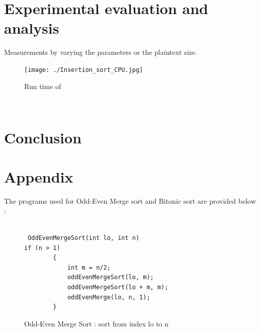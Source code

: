 \documentclass{acm_proc_article-sp}
\begin{document}
\lstset{                                    %
  language=C,
  frame=lines,
  captionpos=b
 }


\renewcommand{\lstlistingname}{Code}

\section{Experimental evaluation and analysis}
\label{Sec:Eval}
Measurements by varying the parameters or the plaintext size.

\begin{figure}[!h] %
\centering
\texttt{[image: ./Insertion\_sort\_CPU.jpg]} 
\caption{Run time of } 
\label{image_f2} %
\end{figure}
\





\section{Conclusion}




  

\newpage
\section{Appendix}

 The programs used for Odd-Even Merge sort and Bitonic sort are provided below : 


\begin{figure}[h]
\begin{lstlisting}[label = oesort ]

 OddEvenMergeSort(int lo, int n)
if (n > 1)
        {
            int m = n/2;
            oddEvenMergeSort(lo, m);
            oddEvenMergeSort(lo + m, m);
            oddEvenMerge(lo, n, 1);
        }

\end{lstlisting}
\caption{Odd-Even Merge Sort : sort from index lo to n }
\end{figure}
\end{document}
